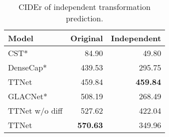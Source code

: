 \begin{table}[ht]
\centering
\small
\caption{CIDEr of independent transformation prediction.}
\label{tab:single}
\begin{tabular}{lrr}
\toprule
Model & Original & Independent \\
\midrule
CST* & 84.90 & 49.80 \\
DenseCap* & 439.53 & 295.75 \\
TTNet & 459.84 & \textbf{459.84} \\
GLACNet* & 508.19 & 268.49 \\
TTNet w/o diff & 527.62 & 422.04 \\
TTNet & \textbf{570.63} & 349.96 \\
\bottomrule
\end{tabular}
\end{table}
